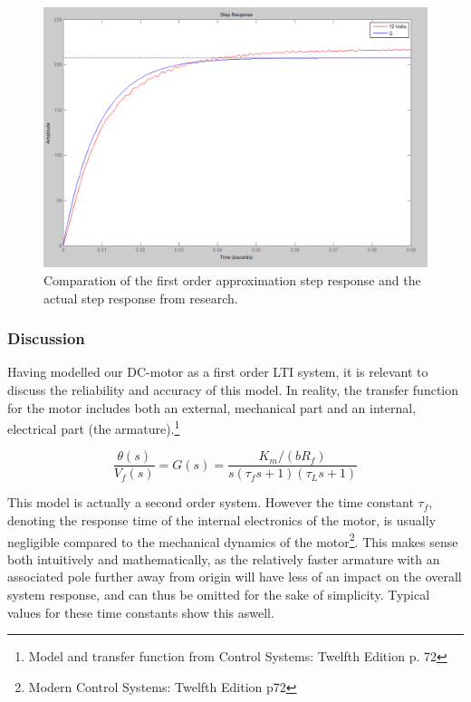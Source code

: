 \begin{figure}[h!]
\centering
\includegraphics[scale=0.35]{Billeder/FirstOrderApproximation.png}
\caption{Comparation of the first order approximation step response and the actual step response from research.}
\label{fig:FirstOrderApproximation}
\end{figure}

\subsubsection{Discussion}
Having modelled our DC-motor as a first order LTI system, it is relevant to discuss the reliability and accuracy of this model. In reality, the transfer function for the motor includes both an external, mechanical part and an internal, electrical part (the armature).\footnote{Model and transfer function from Control Systems: Twelfth Edition p. 72}

\begin{equation}
\frac{\theta(s)}{V_f (s)}=G(s)=\frac{K_m / (bR_f)}{s(\tau_f s+1)(\tau_L s+1)}
\end{equation}

This model is actually a second order system. However the time constant $\tau_f$, denoting the response time of the internal electronics of the motor, is usually negligible compared to the mechanical dynamics of the motor\footnote{Modern Control Systems: Twelfth Edition p72}. This makes sense both intuitively and mathematically, as the relatively faster armature with an associated pole further away from origin will have less of an impact on the overall system response, and can thus be omitted for the sake of simplicity. Typical values for these time constants show this aswell.

